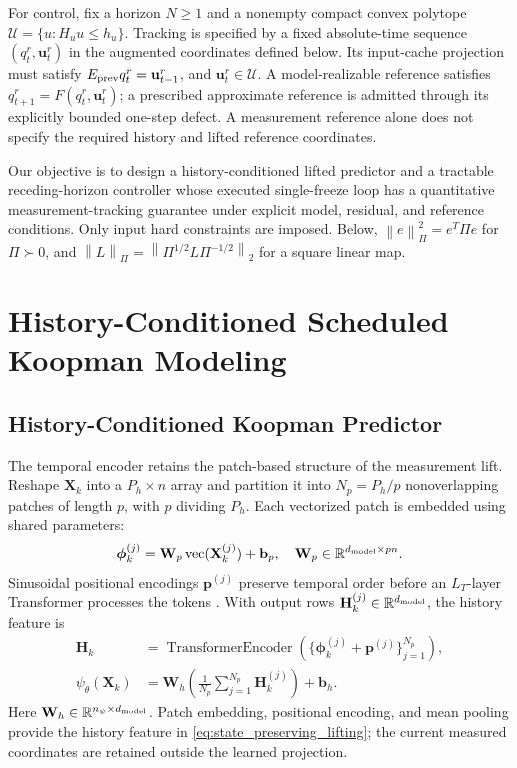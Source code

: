 \documentclass[journal]{IEEEtran}
\newcommand{\vphi}{\boldsymbol{\phi}}
\newcommand{\vp}{\mathbf{p}}
\newcommand{\vb}{\mathbf{b}}
\newcommand{\vu}{\mathbf{u}}
\newcommand{\mH}{\mathbf{H}}
\newcommand{\mW}{\mathbf{W}}
\newcommand{\mX}{\mathbf{X}}
\newcommand{\R}{\mathbb{R}}
\newcommand{\norm}[1]{\left\lVert #1\right\rVert}
\begin{document}
For control, fix a horizon $N\ge1$ and a nonempty compact convex polytope $\mathcal U=\{u:H_u u\le h_u\}$. Tracking is specified by a fixed absolute-time sequence $(q_t^r,\vu_t^r)$ in the augmented coordinates defined below. Its input-cache projection must satisfy $E_{\rm prev}q_t^r=\vu_{t-1}^r$, and $\vu_t^r\in\mathcal U$. A model-realizable reference satisfies $q_{t+1}^r=F(q_t^r,\vu_t^r)$; a prescribed approximate reference is admitted through its explicitly bounded one-step defect. A measurement reference alone does not specify the required history and lifted reference coordinates.

Our objective is to design a history-conditioned lifted predictor and a tractable receding-horizon controller whose executed single-freeze loop has a quantitative measurement-tracking guarantee under explicit model, residual, and reference conditions. Only input hard constraints are imposed. Below, $\norm{e}_\Pi^2=e^T\Pi e$ for $\Pi\succ0$, and $\norm{L}_\Pi=\norm{\Pi^{1/2}L\Pi^{-1/2}}_2$ for a square linear map.

\section{History-Conditioned Scheduled Koopman Modeling}
\label{sec:model}
\subsection{History-Conditioned Koopman Predictor}
\label{sec:temporal_lifting}
The temporal encoder retains the patch-based structure of the measurement lift. Reshape $\mX_k$ into a $P_h\times n$ array and partition it into $N_p=P_h/p$ nonoverlapping patches of length $p$, with $p$ dividing $P_h$. Each vectorized patch is embedded using shared parameters:
\begin{equation}
\vphi_k^{(j)}=\mW_p\operatorname{vec}(\mX_k^{(j)})+\vb_p,
\quad \mW_p\in\R^{d_{\rm model}\times pn}.
\label{eq:patch_embedding}
\end{equation}
Sinusoidal positional encodings $\vp^{(j)}$ preserve temporal order before an $L_T$-layer Transformer processes the tokens \cite{vaswani2017attention}. With output rows $\mH_k^{(j)}\in\R^{d_{\rm model}}$, the history feature is
\begin{align}
\mH_k&=\operatorname{TransformerEncoder}
  (\{\vphi_k^{(j)}+\vp^{(j)}\}_{j=1}^{N_p}),\label{eq:transformer_enc}\\
\psi_\theta(\mX_k)&=\mW_h\left(\frac1{N_p}\sum_{j=1}^{N_p}\mH_k^{(j)}\right)+\vb_h.
\label{eq:history_feature}
\end{align}
Here $\mW_h\in\R^{n_\psi\times d_{\rm model}}$. Patch embedding, positional encoding, and mean pooling provide the history feature in \eqref{eq:state_preserving_lifting}; the current measured coordinates are retained outside the learned projection.
\end{document}
